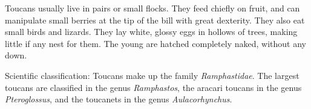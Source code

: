 \documentclass[english]{article}
\begin{document}
Toucans usually live in pairs or small flocks. They feed chiefly on
fruit, and can manipulate small berries at the tip of the bill with
great dexterity. They also eat small birds and lizards. They lay white,
glossy eggs in hollows of trees, making little if any nest for them. The
young are hatched completely naked, without any down.

Scientific classification: Toucans make up the family
\emph{Ramphastidae}. The largest toucans are classified in the genus
\emph{Ramphastos}, the aracari toucans in the genus \emph{Pteroglossus},
and the toucanets in the genus \emph{Aulacorhynchus}.
\end{document}
